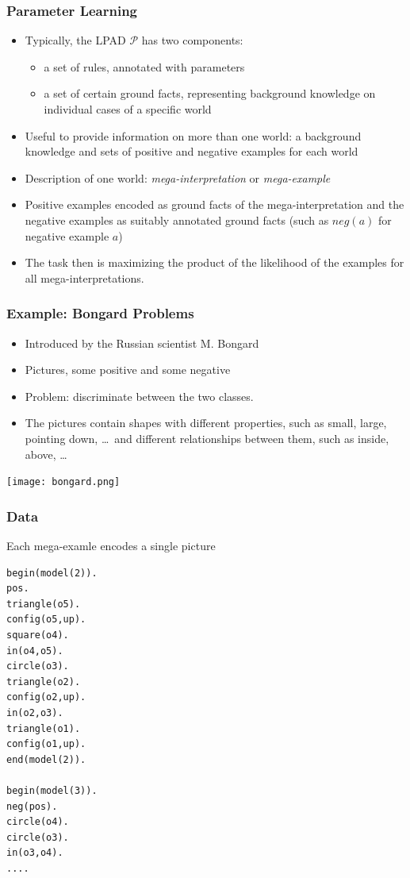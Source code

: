 \documentclass[trans,aspectratio=1610]{beamer}
\newcommand{\defpprog}{\ensuremath{\mathcal{P}}\xspace}
\begin{document}
\begin{frame}
\frametitle{Parameter Learning}
\begin{itemize}
\item 
Typically, the LPAD \defpprog has two components:
 \begin{itemize}
\item  a set of rules, annotated with parameters 
\item  a set of certain ground facts, representing background knowledge
on individual cases of a specific world
\end{itemize}
\item Useful to provide information on more than one world: a background knowledge and sets of positive and negative examples for each world 
\item Description
of one world: \emph{mega-interpretation} or 
\emph{mega-example}
\item Positive examples encoded
as ground facts of the mega-interpretation and the negative examples as suitably annotated 
ground facts (such as $neg(a)$ for negative example $a$) 
\item The task then is maximizing the product of the likelihood of 
the examples for all mega-interpretations.
\end{itemize}
\end{frame}




\begin{frame}
  \frametitle{Example: Bongard Problems}
\begin{itemize}
\item
Introduced by the Russian
scientist M. Bongard
\item
Pictures, some positive and some negative
\item Problem: discriminate between the two classes.
\item
The pictures contain shapes with different properties, such as small, large, pointing down, \ldots\ and different relationships between them, such as inside, above, \ldots\
\end{itemize}
\begin{center}
\texttt{[image: bongard.png]}
\end{center}
\end{frame}



\begin{frame}[fragile]
  \frametitle{Data}
Each mega-examle  encodes a single picture
\begin{scriptsize}
\begin{verbatim}
begin(model(2)).
pos.
triangle(o5).
config(o5,up).
square(o4).
in(o4,o5).
circle(o3).
triangle(o2).
config(o2,up).
in(o2,o3).
triangle(o1).
config(o1,up).
end(model(2)).

begin(model(3)).
neg(pos).
circle(o4).
circle(o3).
in(o3,o4).
....
\end{verbatim}
\end{scriptsize}

\end{frame}
\end{document}
